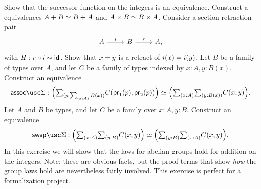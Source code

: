 \begin{exercises}
\begin{subexenum}
  \end{subexenum}
  \exercise \label{ex:succ_equiv}Show that the successor function on the integers is an equivalence.
  \exercise \label{ex:comm_prod}Construct a equivalences $\eqv{A+B}{B+A}$ and $\eqv{A\times B}{B\times A}$.
  \exercise \label{ex:retr_id} Consider a section-retraction pair
  \begin{equation*}
    \begin{tikzcd}
      A \arrow[r,"i"] & B \arrow[r,"r"] & A,
    \end{tikzcd}
  \end{equation*}
  with $H:r\circ i\sim \mathsf{id}_{}$. Show that $\id{x}{y}$ is a retract of $\id{i(x)}{i(y)}$.
  \exercise \label{ex:sigma_assoc}Let $B$ be a family of types over $A$, and let $C$ be a family of types indexed by $x:A,y:B(x)$. Construct an equivalence
  \begin{equation*}
    \assocSigma:\eqv{\Big(\sm{p:\sm{x:A}B(x)}C(\proj 1(p),\proj 2(p))\Big)}{\Big(\sm{x:A}\sm{y:B(x)}C(x,y)\Big)}.
  \end{equation*}
  \exercise \label{ex:sigma_swap}Let $A$ and $B$ be types, and let $C$ be a family over $x:A,y:B$. Construct an equivalence
  \begin{equation*}
    \swapSigma:\eqv{\Big(\sm{x:A}\sm{y:B}C(x,y)\Big)}{\Big(\sm{y:B}\sm{x:A}C(x,y)\Big)}.
  \end{equation*}
  \exercise \label{ex:int_group_laws} In this exercise we will show that the laws for abelian groups hold for addition on the integers. Note: these are obvious facts, but the proof terms that show \emph{how} the group laws hold are nevertheless fairly involved. This exercise is perfect for a formalization project. 
  \begin{subexenum}

\end{subexenum}
\end{exercises}
